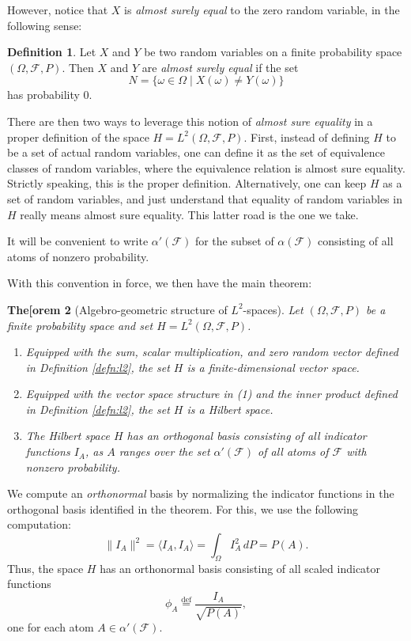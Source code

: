 \documentclass[11pt]{book}
\newtheorem{thm}{The[orem}[section]
\theoremstyle{definition}
\newtheorem{defn}[thm]{Definition}
\numberwithin{equation}{section}
\begin{document}
However, notice that $X$ is \textit{almost surely equal} to the zero random variable, in the following sense:

\begin{defn}
	Let $X$ and $Y$ be two random variables on a finite probability space $(\Omega, \mathcal{F}, P)$. Then $X$ and $Y$ are \textit{almost surely equal} if the set
	\[
		N = \{\omega \in \Omega \mid X(\omega) \neq Y(\omega) \}
	\]
	has probability $0$.
\end{defn}

There are then two ways to leverage this notion of \textit{almost sure equality} in a proper definition of the space $H = L^2(\Omega, \mathcal{F},P)$. First, instead of defining $H$ to be a set of actual random variables, one can define it as the set of equivalence classes of random variables, where the equivalence relation is almost sure equality. Strictly speaking, this is the proper definition. Alternatively, one can keep $H$ as a set of random variables, and just understand that equality of random variables in $H$ really means almost sure equality. This latter road is the one we take.

It will be convenient to write $\alpha'(\mathcal{F})$ for the subset of $\alpha(\mathcal{F})$ consisting of all atoms of nonzero probability.

With this convention in force, we then have the main theorem:

\begin{thm}[Algebro-geometric structure of $L^2$-spaces]\label{thm:hilbert}
	Let $(\Omega, \mathcal{F}, P)$ be a finite probability space and set $H = L^2(\Omega, \mathcal{F}, P)$.
	\begin{enumerate}
		\item Equipped with the sum, scalar multiplication, and zero random vector defined in Definition \ref{defn:l2}, the set $H$ is a finite-dimensional vector space.
		\item Equipped with the vector space structure in (1) and the inner product defined in Definition \ref{defn:l2}, the set $H$ is a Hilbert space.
		\item The Hilbert space $H$ has an orthogonal basis consisting of all indicator functions $I_A$, as $A$ ranges over the set $\alpha'(\mathcal{F})$ of all atoms of $\mathcal{F}$ with nonzero probability.
	\end{enumerate}
\end{thm}

We compute an \textit{orthonormal} basis by normalizing the indicator functions in the orthogonal basis identified in the theorem. For this, we use the following computation:
\[
	\| I_A \|^2 = \langle I_A, I_A \rangle = \int_\Omega I_A^2 \, dP = P(A).
\]
Thus, the space $H$ has an orthonormal basis consisting of all scaled indicator functions
\begin{equation}\label{eq:onb}
	\phi_A \stackrel{\text{def}}{=} \frac{I_A}{\sqrt{P(A)}},
\end{equation}
one for each atom $A\in \alpha'(\mathcal{F})$.
\end{document}
